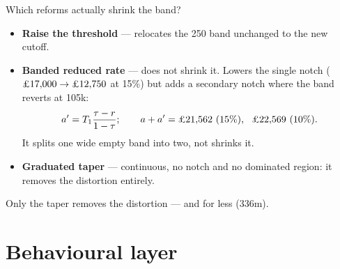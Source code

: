 \documentclass[aspectratio=169]{beamer}
\renewcommand{\pounds}{\ifmmode\text{\textsterling}\else\textsterling\fi}
\begin{document}
\begin{frame}{Which reforms actually shrink the band?}
  \begin{itemize}\itemsep0.3cm
    \item \textbf{Raise the threshold} --- \alert{relocates} the \pounds21{,}250
      band unchanged to the new cutoff.
    \item \textbf{Banded reduced rate} --- does \alert{not} shrink it. Lowers the
      single notch ($\pounds17{,}000 \to \pounds12{,}750$ at 15\%) but adds a
      \alert{secondary notch} where the band reverts at \pounds105k:
      \[ a' = T_1\frac{\tau-r}{1-\tau}; \qquad
         a+a' = \pounds21{,}562\ (15\%),\ \ \pounds22{,}569\ (10\%). \]
      It \alert{splits one wide empty band into two}, not shrinks it.
    \item \textbf{Graduated taper} --- continuous, \alert{no notch and no
      dominated region}: it removes the distortion entirely.
  \end{itemize}
  \vspace{0.2cm}
  \begin{center}
    \alert{Only the taper removes the distortion --- and for less (\pounds336m).}
  \end{center}
\end{frame}

\section{Behavioural layer}
\end{document}
